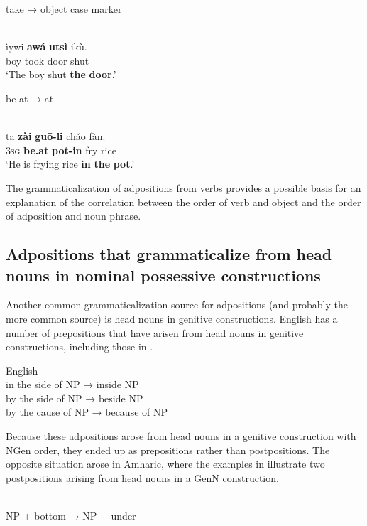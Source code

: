 \documentclass[output=paper]{langsci/langscibook}
\begin{document}
take → object case marker

\ea\label{ex:dryer:}
\\
\gll     ìywi  \textbf{awá}  \textbf{utsì}  ikù.\\
         boy  took  door  shut\\
\glt     ‘The boy shut \textbf{the} \textbf{door}.’
\z

be at → at

\ea\label{ex:dryer:}
\\
\gll     tā  \textbf{zài}  \textbf{guō-li}  chǎo  fàn.\\
         3\textsc{sg}  \textbf{be.at}  \textbf{pot-in}  fry  rice\\
\glt     ‘He is frying rice \textbf{in} \textbf{the} \textbf{pot}.’
\z

The grammaticalization of adpositions from verbs provides a possible basis for an explanation of the correlation between the order of verb and object and the order of adposition and noun phrase.

\subsection{Adpositions that grammaticalize from head nouns in nominal possessive constructions}

Another common grammaticalization source for adpositions (and probably the more common source) is head nouns in genitive constructions. English has a number of prepositions that have arisen from head nouns in genitive constructions, including those in .

\ea
{English}\\
\ea in the side of NP → inside NP\\
\ex by the side of NP → beside NP\\
\ex by the cause of NP → because of NP\\
\z
\z

Because these adpositions arose from head nouns in a genitive construction with NGen order, they ended up as prepositions rather than postpositions. The opposite situation arose in Amharic, where the examples in  illustrate two postpositions arising from head nouns in a GenN construction.

\ea\label{ex:dryer:}
 \\
\ea
NP + bottom → NP + under\\
\end{document}
